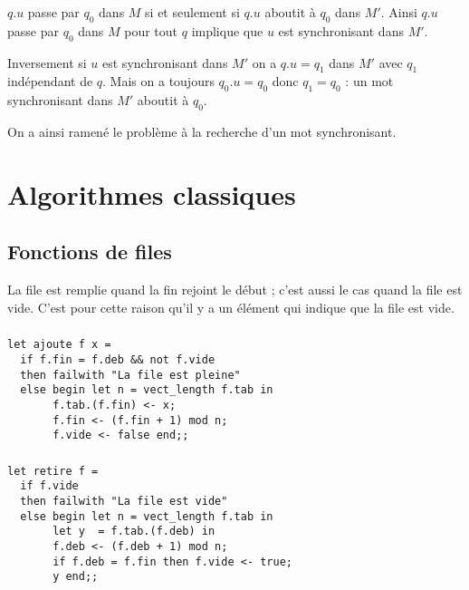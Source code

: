 $q.u$ passe par $q_0$ dans $M$ si et seulement si $q.u$ aboutit à $q_0$ dans $M'$. Ainsi $q.u$ passe par $q_0$ dans $M$ pour tout $q$ implique que $u$ est synchronisant dans $M'$.

Inversement si $u$ est synchronisant dans $M'$ on a $q.u=q_1$ dans $M'$ avec $q_1$ indépendant de $q$. Mais on a toujours $q_0.u=q_0$ donc $q_1=q_0$ : un mot synchronisant dans $M'$ aboutit à $q_0$.

On a ainsi ramené le problème à la recherche d'un mot synchronisant.
\section{Algorithmes classiques}
\subsection{Fonctions de files}
La file est remplie quand la fin rejoint le début ; c'est aussi le cas quand la file est vide. C'est pour cette raison qu'il y a un élément qui indique que la file est vide.
\subsubsection{}
\begin{lstlisting}
let ajoute f x =
  if f.fin = f.deb && not f.vide
  then failwith "La file est pleine"
  else begin let n = vect_length f.tab in
       f.tab.(f.fin) <- x;
       f.fin <- (f.fin + 1) mod n;
       f.vide <- false end;;
\end{lstlisting}
\subsubsection{}
\begin{lstlisting}
let retire f =
  if f.vide
  then failwith "La file est vide"
  else begin let n = vect_length f.tab in
       let y  = f.tab.(f.deb) in
       f.deb <- (f.deb + 1) mod n;
       if f.deb = f.fin then f.vide <- true;
       y end;;
\end{lstlisting}
